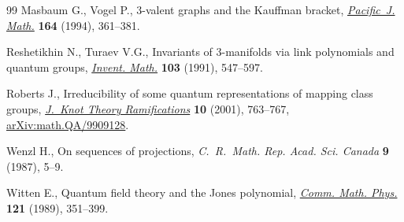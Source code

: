 \documentclass[pdftex]{sigma}
\numberwithin{equation}{section}
\begin{document}
\begin{thebibliography}{99}
Masbaum G., Vogel P., {$3$}-valent graphs and the {K}auffman bracket,
 \href{https://doi.org/10.2140/pjm.1994.164.361}{\textit{Pacific~J. Math.}} \textbf{164} (1994), 361--381.

Reshetikhin N., Turaev V.G., Invariants of {$3$}-manifolds via link polynomials
 and quantum groups, \href{https://doi.org/10.1007/BF01239527}{\textit{Invent. Math.}} \textbf{103} (1991), 547--597.

Roberts J., Irreducibility of some quantum representations of mapping class
 groups, \href{https://doi.org/10.1142/S021821650100113X}{\textit{J.~Knot Theory Ramifications}} \textbf{10} (2001), 763--767,
 \href{https://arxiv.org/abs/math.QA/9909128}{arXiv:math.QA/9909128}.

Wenzl H., On sequences of projections, \textit{C.~R.~Math. Rep. Acad. Sci.
 Canada} \textbf{9} (1987), 5--9.

Witten E., Quantum field theory and the {J}ones polynomial, \href{http://dx.doi.org/10.1007/BF01217730}{\textit{Comm. Math.
 Phys.}} \textbf{121} (1989), 351--399.

\end{thebibliography}\LastPageEnding
\end{document}
